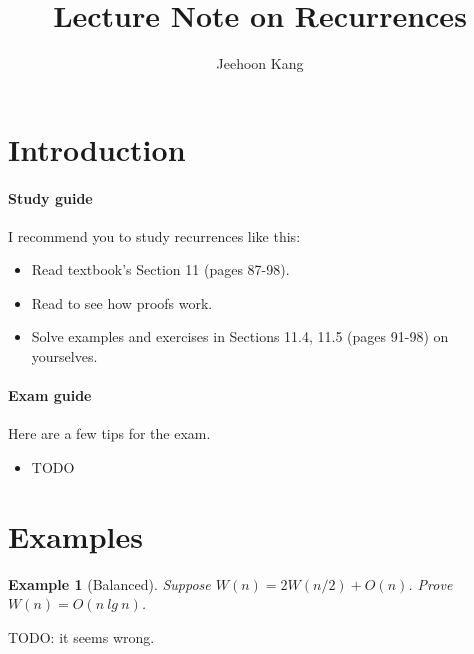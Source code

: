 \documentclass[11pt,a4paper,oneside,microtype,nokorean]{oblivoir}
\newtheorem{example}{Example}
\begin{document}
\title{Lecture Note on Recurrences}
\author{Jeehoon Kang}
\maketitle

\section{Introduction}

\paragraph{Study guide}

I recommend you to study recurrences like this:

\begin{itemize}
\item Read textbook's Section 11 (pages 87-98).
\item Read  to see how proofs work.
\item Solve examples and exercises in Sections 11.4, 11.5 (pages 91-98) on yourselves.
\end{itemize}


\paragraph{Exam guide}

Here are a few tips for the exam.

\begin{itemize}
\item TODO
\end{itemize}


\section{Examples}
\label{sec:examples}


\begin{example}[Balanced] Suppose $W(n) = 2W(n/2) + O(n)$.  Prove $W(n) = O(n~lg~n)$.
\end{example}

TODO: it seems wrong.
\end{document}
